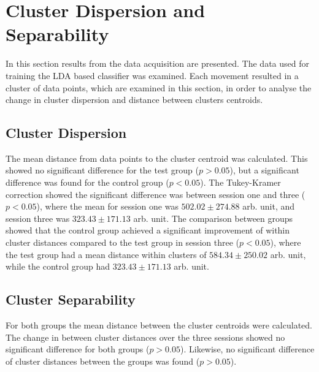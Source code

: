 \section{Cluster Dispersion and Separability}
In this section results from the data acquisition are presented. The data used for training the LDA based classifier was examined. Each movement resulted in a cluster of data points, which are examined in this section, in order to analyse the change in cluster dispersion and distance between clusters centroids.

\subsection{Cluster Dispersion}
The mean distance from data points to the cluster centroid was calculated. This showed no significant difference for the test group ($p > 0.05$), but a significant difference was found for the control group ($p < 0.05$). The Tukey-Kramer correction showed the significant difference was between session one and three ($p < 0.05$), where the mean for session one was $502.02 \pm 274.88$ arb. unit, and session three was $323.43 \pm 171.13$ arb. unit. The comparison between groups showed that the control group achieved a significant improvement of within cluster distances compared to the test group in session three ($p < 0.05$), where the test group had a mean distance within clusters of $584.34 \pm 250.02$ arb. unit, while the control group had $323.43 \pm 171.13$ arb. unit.

\subsection{Cluster Separability}
For both groups the mean distance between the cluster centroids were calculated. The change in between cluster distances over the three sessions showed no significant difference for both groups ($p > 0.05$). Likewise, no significant difference of cluster distances between the groups was found ($p > 0.05$).\\


